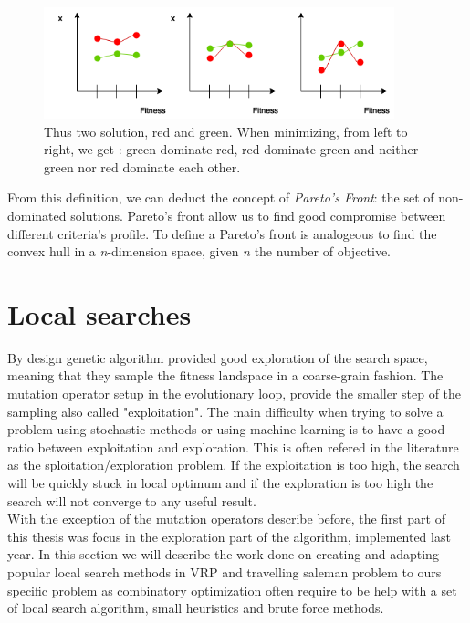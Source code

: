 \documentclass[12pt]{memoir}
\begin{document}
\begin{figure}[htbp]
	\begin{center}
		\includegraphics[width=4in]{img/paretoDominance.png}
		\caption{Thus two solution, red and green. When minimizing, from left to right, we get : green dominate red, red dominate green and neither green nor red dominate each other.}
	\end{center}
\end{figure}



From this definition, we can deduct the concept of \emph{Pareto's Front}: the set of non-dominated solutions. Pareto's front allow us to find good compromise between different criteria's profile. To define a Pareto's front is analogeous to find the convex hull\cite{godfrey2007algorithms} in a \textit{n}-dimension space, given \textit{n} the number of objective.

\label{par:Multi-objective selection }


\section{Local searches}
By design genetic algorithm provided good exploration of the search space, meaning that they sample the fitness landspace in a coarse-grain fashion.
The mutation operator setup in the evolutionary loop, provide the smaller step of the sampling also called "exploitation". The main difficulty when trying to 
solve a problem using stochastic methods or using machine learning is to have a good ratio between exploitation and exploration. This is often refered in the literature as the sploitation/exploration problem. If the exploitation is too high, the search will be quickly stuck in local optimum and if the exploration is too high the search will not converge to any useful result. \\
With the exception of the mutation operators describe before, the first part of this thesis was focus in the exploration part of the algorithm, implemented last year. In this section we will describe the work done on creating and adapting popular local search methods in VRP and travelling saleman problem to ours specific problem as combinatory optimization often require to be help with a set of local search algorithm, small heuristics and brute force methods.
\end{document}
